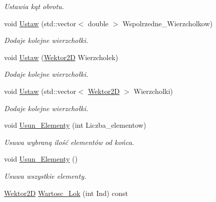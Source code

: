 \begin{DoxyCompactItemize}
\begin{DoxyCompactList}\small\item\em Ustawia kąt obrotu. \end{DoxyCompactList}\item 
void \hyperlink{class_objekt___graficzny_a8696af86777439596367520e67e824b9}{Ustaw} (std\+::vector$<$ double $>$ Wspolrzedne\+\_\+\+Wierzcholkow)
\begin{DoxyCompactList}\small\item\em Dodaje kolejne wierzchołki. \end{DoxyCompactList}\item 
void \hyperlink{class_objekt___graficzny_aa53a8a0cb8886e4aeb0b843d7bfff53a}{Ustaw} (\hyperlink{class_wektor2_d}{Wektor2\+D} Wierzcholek)
\begin{DoxyCompactList}\small\item\em Dodaje kolejne wierzchołki. \end{DoxyCompactList}\item 
void \hyperlink{class_objekt___graficzny_aea7b281802a335bc075a09a570538b5c}{Ustaw} (std\+::vector$<$ \hyperlink{class_wektor2_d}{Wektor2\+D} $>$ Wierzcholki)
\begin{DoxyCompactList}\small\item\em Dodaje kolejne wierzchołki. \end{DoxyCompactList}\item 
void \hyperlink{class_objekt___graficzny_aec73cbdb6b8e8519dd9f418a37072ae3}{Usun\+\_\+\+Elementy} (int Liczba\+\_\+elementow)
\begin{DoxyCompactList}\small\item\em Usuwa wybraną ilość elementów od końca. \end{DoxyCompactList}\item 
\hypertarget{class_objekt___graficzny_aa508473ea86c48f2d0acb5339f47177d}{void \hyperlink{class_objekt___graficzny_aa508473ea86c48f2d0acb5339f47177d}{Usun\+\_\+\+Elementy} ()}\label{class_objekt___graficzny_aa508473ea86c48f2d0acb5339f47177d}

\begin{DoxyCompactList}\small\item\em Usuwa wszystkie elementy. \end{DoxyCompactList}\item 
\hypertarget{class_objekt___graficzny_ad893e3051506b480a1338c2c234859d3}{\hyperlink{class_wektor2_d}{Wektor2\+D} \hyperlink{class_objekt___graficzny_ad893e3051506b480a1338c2c234859d3}{Wartosc\+\_\+\+Lok} (int Ind) const }\label{class_objekt___graficzny_ad893e3051506b480a1338c2c234859d3}


\end{DoxyCompactItemize}
